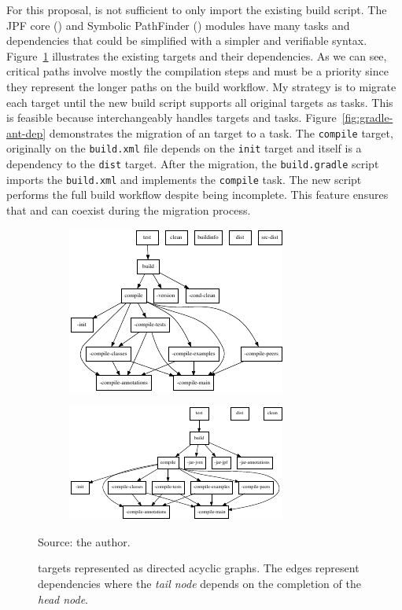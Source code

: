 \documentclass{article}
\begin{document}
For this proposal, is not sufficient to only import the existing build script. 
The JPF core (\jpfcore) and Symbolic PathFinder (\jpfsymbc) modules have many
tasks and dependencies that could be simplified with a simpler and verifiable
syntax.
Figure~\ref{fig:tasks} illustrates the existing \ant{} targets and their
dependencies.
As we can see, critical paths involve mostly the compilation steps and must
be a priority since they represent the longer paths on the build workflow.
My strategy is to migrate each \ant{} target until the new build script
supports all original targets as \gradle{} tasks.
This is feasible because \gradle{} interchangeably handles \ant{} targets and
\gradle{} tasks.
Figure~\ref{fig:gradle-ant-dep} demonstrates the migration of an \ant{} target
to a \gradle{} task.
The \texttt{compile} target, originally on the \texttt{build.xml} file depends
on the \texttt{init} target and itself is a dependency to the \texttt{dist}
target.
After the migration, the \texttt{build.gradle} script imports the
\texttt{build.xml} and implements the \texttt{compile} task.
The new \gradle{} script performs the full build workflow despite being
incomplete.
This feature ensures that \ant{} and \gradle{} can coexist during the migration
process.

\clearpage

\begin{figure}[t!]
    \centering
    \begin{subfigure}[b]{\textwidth}
        \centering
        \includegraphics[scale=2.45]{figs/jpf-tasks.pdf}%
        \caption{\jpfcore{}}
    \end{subfigure}
    \begin{subfigure}[b]{\textwidth}
        \centering
        \vspace{1.1cm}
        \includegraphics[scale=2.9]{figs/symbc-tasks.pdf}%
        \caption{\jpfsymbc{}}
    \end{subfigure}
    \vspace{5mm}
    \caption{\ant{} targets represented as directed acyclic graphs. The edges
    represent dependencies where the \emph{tail node} depends on the completion
    of the \emph{head node}.\label{fig:tasks}}
    {\scriptsize Source: the author.}
\end{figure}
\end{document}
